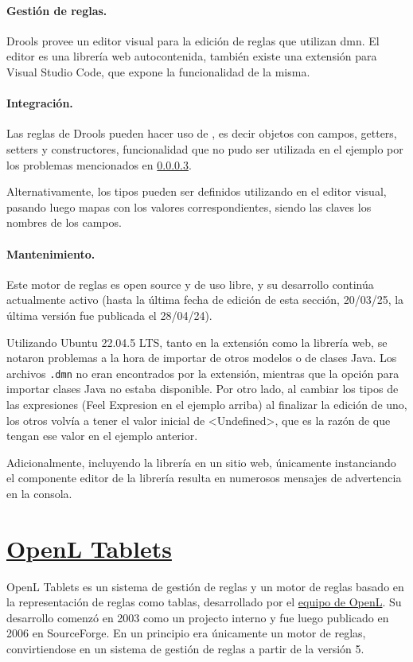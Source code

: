 \paragraph{Gestión de reglas.}
Drools provee un editor visual para la edición de reglas que utilizan \acrshort{dmn}. El editor es una librería web autocontenida, también existe una extensión para Visual Studio Code, que expone la funcionalidad de la misma.

\paragraph{Integración.}
Las reglas de Drools pueden hacer uso de , es decir objetos con campos, getters, setters y constructores, funcionalidad que no pudo ser utilizada en el ejemplo por los problemas mencionados en \cref{para:drools_mantenimiento}.

Alternativamente, los tipos pueden ser definidos utilizando en el editor visual, pasando luego mapas con los valores correspondientes, siendo las claves los nombres de los campos.

\paragraph{Mantenimiento.}\label{para:drools_mantenimiento}
Este motor de reglas es open source y de uso libre, y su desarrollo continúa actualmente activo (hasta la última fecha de edición de esta sección, 20/03/25, la última versión fue publicada el 28/04/24).

Utilizando Ubuntu 22.04.5 LTS, tanto en la extensión como la librería web, se notaron problemas a la hora de importar de otros modelos o de clases Java. Los archivos \verb|.dmn| no eran encontrados por la extensión, mientras que la opción para importar clases Java no estaba disponible. Por otro lado, al cambiar los tipos de las expresiones (Feel Expresion en el ejemplo arriba) al finalizar la edición de uno, los otros volvía a tener el valor inicial de <Undefined>, que es la razón de que tengan ese valor en el ejemplo anterior.

Adicionalmente, incluyendo la librería en un sitio web, únicamente instanciando el componente editor de la librería resulta en numerosos mensajes de advertencia en la consola.

\section{\href{https://openl-tablets.org/}{OpenL Tablets}}
OpenL Tablets es un sistema de gestión de reglas y un motor de reglas basado en la representación de reglas como tablas, desarrollado por el \href{https://openl-tablets.org/community/team}{equipo de OpenL}. Su desarrollo comenzó en 2003 como un projecto interno y fue luego publicado en 2006 en SourceForge. En un principio era únicamente un motor de reglas, convirtiendose en un sistema de gestión de reglas a partir de la versión 5.

